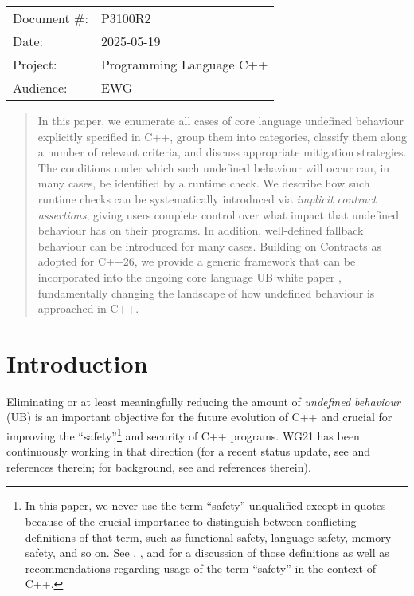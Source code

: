 \begin{tabular}{ll}
Document \#: & P3100R2 \\
Date: &2025-05-19 \\
Project: & Programming Language C++ \\
Audience: & EWG
\end{tabular}

\begin{abstract}
In this paper, we enumerate all cases of core language undefined behaviour explicitly specified in C++,  group them into categories, classify them along a number of relevant criteria, and discuss appropriate mitigation strategies. The conditions under which such undefined behaviour will occur can, in many cases, be identified by a runtime check. We describe how such runtime checks can be systematically introduced via \emph{implicit contract assertions}, giving users complete control over what impact that undefined behaviour has on their programs. In addition, well-defined fallback behaviour can be introduced for many cases. Building on Contracts as adopted for C++26, we provide a generic framework that can be incorporated into the ongoing core language UB white paper \cite{P3656R1}, fundamentally changing the landscape of how undefined behaviour is approached in C++.
\end{abstract}


\tableofcontents*
\pagebreak






\section{Introduction}
\label{intro}

Eliminating or at least meaningfully reducing the amount of \emph{undefined behaviour} (UB) is an important objective for the future evolution of C++ and crucial for improving the ``safety''\footnote{In this paper, we never use the term ``safety'' unqualified except in quotes because of the crucial importance to distinguish between  conflicting definitions of that term, such as functional safety, language safety, memory safety, and so on.  See \cite{P3376R0}, \cite{P3500R1}, and \cite{P3578R0} for a discussion of those definitions as well as recommendations regarding usage of the term ``safety'' in the context of C++.} and security of C++ programs. WG21 has been continuously working in that direction (for a recent status update, see \cite{Sutter2025} and references therein; for background, see \cite{Sutter2024} and references therein).

